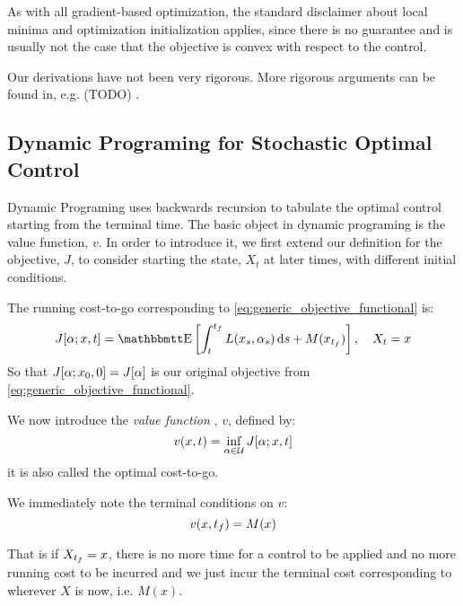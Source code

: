 As with all gradient-based optimization, the standard disclaimer about local
minima and optimization initialization applies, since there is no guarantee and
is usually not the case that the objective is convex with respect to the
control. 

Our derivations have not been very rigorous. More rigorous arguments can be
found in, e.g. (TODO) \cite{Fattorini1999,Borzi2012,Ahmed1981}.
  
 
\subsection{Dynamic Programing for Stochastic Optimal Control}
\label{sec:dynamic_programing}
Dynamic Programing uses backwards recursion to tabulate the optimal control
starting from the terminal time. The basic object in dynamic programing is the
value function, $v$. In order to introduce it, we first extend our definition
for the objective, $J$, to consider starting the state, $X_t$ at later
times, with different initial conditions.

The running cost-to-go corresponding to
\cref{eq:generic_objective_functional} is:
\begin{equation}
J[\a; x, t] = \Exp \left[ \int_t^\tf L(x_s, \a_s) \intd{s} + M(x_\tf) \right] ,
\quad X_t = x
\label{eq:generic_cost_to_go} 
\end{equation}
So that $J[\alpha; x_0, 0] = J[\alpha]$ is our original objective from
\cref{eq:generic_objective_functional}.
 
We now introduce the {\sl  value function} , $v$,
defined by: 
$$
v(x,t) = \inf_{\alpha \in { \mathcal{U} }} J[\alpha; x,t] 
$$
it is also called the optimal cost-to-go. 

We immediately note the terminal conditions on $v$:
\begin{equation}
v(x,{ t_f } ) = M(x)
\end{equation}

That is if $X_{ t_f } = x$, there is no more time for a control to be applied and no
more running cost to be incurred and we just incur the terminal cost
corresponding to wherever $X$ is now, i.e. $M(x)$.
  
